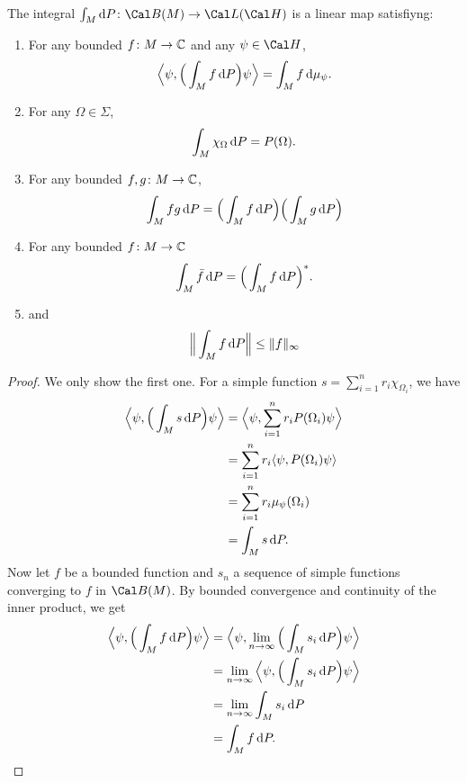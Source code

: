 \begin{proposition}
  \label{prop:propertiesint}
  The integral \(\int_M\d P\colon\Cal B(M)\to\Cal L(\Cal H)\) is a
  linear map satisfiyng:
  \begin{enumerate}
    \item
      For any bounded \(f\colon M\to\mathbb{C}\) and any \(\psi\in\Cal 
      H\),
      \begin{equation}
        \label{eq:fmupsi}
        \Big\langle \psi,\Big(\int_Mf\mathop{}\!\mathrm{d} P\Big) \psi\Big\rangle
        =
        \int_M f\mathop{}\!\mathrm{d}\mu_\psi
      .\end{equation}
    \item 
      For any \(\Omega\in\Sigma\),
      \begin{equation}
        \int_M \chi_\Omega \mathop{}\!\mathrm{d} P = P(\Omega)
      .\end{equation}
    \item 
      For any bounded \(f,g\colon M\to\mathbb{C}\),
      \begin{equation}
        \int_M fg \mathop{}\!\mathrm{d} P = 
        \Big(\int_M f \mathop{}\!\mathrm{d} P\Big)
        \Big(\int_M g \mathop{}\!\mathrm{d} P \Big) 
      \end{equation}
    \item 
      For any bounded \(f\colon M\to\mathbb{C}\)
      \begin{equation}
        \int_M \bar f \mathop{}\!\mathrm{d} P = 
        \Big(\int_M f \mathop{}\!\mathrm{d} P\Big)^{*}.
      \end{equation}
    \item 
      and
      \begin{equation}
        \Big\|\int_Mf\mathop{}\!\mathrm{d} P\Big\| \leq \|f\|_{\infty}
      \end{equation}
  \end{enumerate}
\end{proposition}
\begin{proof}
  We only show the first one.
  For a simple function \(s=\sum_{i=1}^{n}r_i\chi_{\Omega_i}\), we
  have
  \begin{align}
    \Big\langle \psi,\Big(\int_Ms\mathop{}\!\mathrm{d} P\Big) \psi\Big\rangle
    &= \Big\langle \psi,\sum_{i=1}^{n}r_iP(\Omega_i)\psi\Big\rangle \\
    &= \sum_{i=1}^{n}r_i\langle \psi,P(\Omega_i)\psi\rangle \\
    &= \sum_{i=1}^{n}r_i \mu_\psi(\Omega_i) \\
    &= \int_Ms\mathop{}\!\mathrm{d} P
  .\end{align}
  Now let \(f\) be a bounded function and \(s_n\) a sequence of simple
  functions converging to \(f\) in \(\Cal B(M)\). By bounded
  convergence and continuity of the inner product, we get
  \begin{align}
    \Big\langle \psi,\Big(\int_Mf\mathop{}\!\mathrm{d} P\Big) \psi\Big\rangle
    &= \Big\langle \psi,
      \lim_{n\to\infty}
      \Big(\int_Ms_i\mathop{}\!\mathrm{d} P\Big) \psi\Big\rangle \\
    &= \lim_{n\to\infty}
      \Big\langle \psi,\Big(\int_Ms_i\mathop{}\!\mathrm{d} P\Big) \psi\Big\rangle \\
    &= \lim_{n\to\infty} \int_Ms_i\mathop{}\!\mathrm{d} P \\
    &= \int_Mf\mathop{}\!\mathrm{d} P
  .\end{align}
\end{proof}

